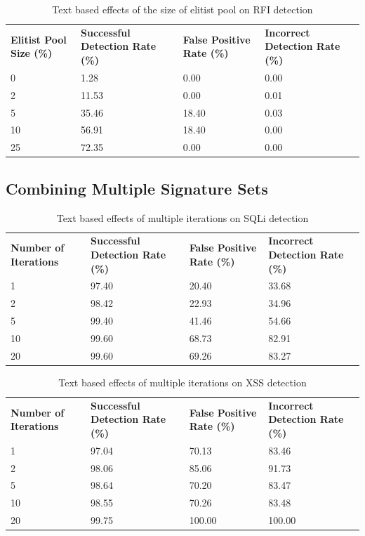 \begin{appendices}
\begin{table}[h]
	\centering
	\begin{tabular}{|p{1.5in}|p{1in}|p{1in}|p{1in}|}
	\hline
	\textbf{Elitist Pool Size (\%)} & \textbf{Successful Detection Rate (\%)} & \textbf{False Positive Rate (\%)} & \textbf{Incorrect Detection Rate (\%)}  \\
	\hhline{|=|=|=|=|}
	0 & 1.28 & 0.00 & 0.00 \\
	\hline
	2 & 11.53 & 0.00 & 0.01 \\
	\hline
	5 & 35.46 & 18.40 & 0.03 \\
	\hline
	10 & 56.91 & 18.40 & 0.00 \\
	\hline
	25 & 72.35 & 0.00 & 0.00 \\
	\hline
	\end{tabular}
	\caption{Text based effects of the size of elitist pool on RFI detection}
\end{table}

\newpage
\subsection{Combining Multiple Signature Sets}

\begin{table}[h]
	\centering
	\begin{tabular}{|p{1.5in}|p{1in}|p{1in}|p{1in}|}
	\hline
	\textbf{Number of Iterations} & \textbf{Successful Detection Rate (\%)} & \textbf{False Positive Rate (\%)} & \textbf{Incorrect Detection Rate (\%)}  \\
	\hhline{|=|=|=|=|}
	1 & 97.40 & 20.40 & 33.68 \\
	\hline
	2 & 98.42 & 22.93 & 34.96 \\
	\hline
	5 & 99.40 & 41.46 & 54.66 \\
	\hline
	10 & 99.60 & 68.73 & 82.91 \\
	\hline
	20 & 99.60 & 69.26 & 83.27 \\
	\hline
	\end{tabular}
	\caption{Text based effects of multiple iterations on SQLi detection}
\end{table}

\begin{table}[h]
	\centering
	\begin{tabular}{|p{1.5in}|p{1in}|p{1in}|p{1in}|}
	\hline
	\textbf{Number of Iterations} & \textbf{Successful Detection Rate (\%)} & \textbf{False Positive Rate (\%)} & \textbf{Incorrect Detection Rate (\%)}  \\
	\hhline{|=|=|=|=|}
	1 & 97.04 & 70.13 & 83.46 \\
	\hline
	2 & 98.06 & 85.06 & 91.73 \\
	\hline
	5 & 98.64 & 70.20 & 83.47 \\
	\hline
	10 & 98.55 & 70.26 & 83.48 \\
	\hline
	20 & 99.75 & 100.00 & 100.00 \\
	\hline
	\end{tabular}
	\caption{Text based effects of multiple iterations on XSS detection}
\end{table}


\end{appendices}
